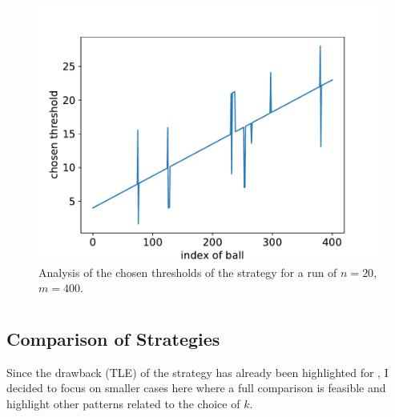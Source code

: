 \begin{figure}[h]
    \centering
    \includegraphics[scale=0.6]{Chapter4/Figs/dqn_learnt_thresholds_20_400.pdf}
    \caption{Analysis of the chosen thresholds of the \DQN strategy for a run of $n=20$, $m=400$.}
    \label{two-thinning-dqn-thresholds}
\end{figure}



\section{\KThinning}



\subsection{Comparison of Strategies}


Since the drawback (TLE) of the \DP strategy has already been highlighted for \TwoThinning, I decided to focus on smaller cases here where a full comparison is feasible and highlight other patterns related to the choice of $k$.


